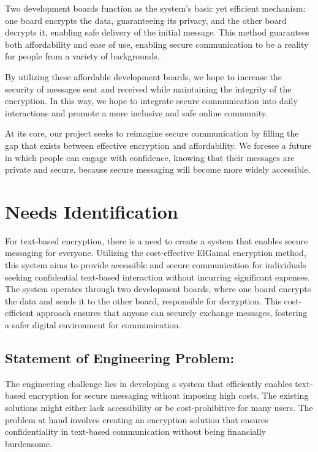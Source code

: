 \documentclass[12pt]{article}
\begin{document}
	Two development boards function as the system's basic yet efficient mechanism: one board encrypts the data, guaranteeing its privacy, and the other board decrypts it, enabling safe delivery of the initial message. This method guarantees both affordability and ease of use, enabling secure communication to be a reality for people from a variety of backgrounds.
	
	By utilizing these affordable development boards, we hope to increase the security of messages sent and received while maintaining the integrity of the encryption. In this way, we hope to integrate secure communication into daily interactions and promote a more inclusive and safe online community.
	
	At its core, our project seeks to reimagine secure communication by filling the gap that exists between effective encryption and affordability. We foresee a future in which people can engage with confidence, knowing that their messages are private and secure, because secure messaging will become more widely accessible.
	
	
	\vskip 20cm
	\section{Needs Identification}
	
	For text-based encryption, there is a need to create a system that enables secure messaging for everyone. Utilizing the cost-effective ElGamal encryption method, this system aims to provide accessible and secure communication for individuals seeking confidential text-based interaction without incurring significant expenses. The system operates through two development boards, where one board encrypts the data and sends it to the other board, responsible for decryption. This cost-efficient approach ensures that anyone can securely exchange messages, fostering a safer digital environment for communication.
	
	
	\subsection{Statement of Engineering Problem:}
	The engineering challenge lies in developing a system that efficiently enables text-based encryption for secure messaging without imposing high costs. The existing solutions might either lack accessibility or be cost-prohibitive for many users. The problem at hand involves creating an encryption solution that ensures confidentiality in text-based communication without being financially burdensome.
	
\end{document}
